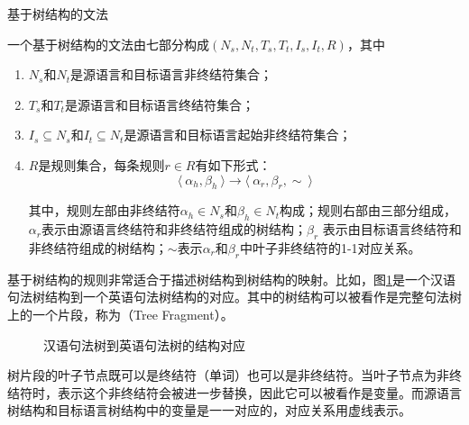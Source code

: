 \vspace{0.5em}
\begin{definition} 基于树结构的文法

{\small
一个基于树结构的文法由七部分构成$(N_s, N_t, T_s, T_t, I_s, I_t, R)$，其中
\begin{enumerate}
\item $N_s$和$N_t$是源语言和目标语言非终结符集合；
\item $T_s$和$T_t$是源语言和目标语言终结符集合；
\item $I_s \subseteq N_s$和$I_t \subseteq N_t$是源语言和目标语言起始非终结符集合；
\item $R$是规则集合，每条规则$r \in R$有如下形式：
\vspace{-1em}
\begin{displaymath}
\langle\  \alpha_h, \beta_h\ \rangle \to \langle\ \alpha_r, \beta_r, \sim\ \rangle
\end{displaymath}

其中，规则左部由非终结符$\alpha_h \in N_s$和$\beta_h \in N_t$构成；规则右部由三部分组成，$\alpha_r$表示由源语言终结符和非终结符组成的树结构；$\beta_r$ 表示由目标语言终结符和非终结符组成的树结构；$\sim$表示$\alpha_r$和$\beta_r$中叶子非终结符的1-1对应关系。
\end{enumerate}
}
\end{definition}

\parinterval 基于树结构的规则非常适合于描述树结构到树结构的映射。比如，图\ref{fig:8-19}是一个汉语句法树结构到一个英语句法树结构的对应。其中的树结构可以被看作是完整句法树上的一个片段，称为{\small{}}（Tree Fragment）。

\begin{figure}[htp]
\centering

\vspace{-2em}
\caption{汉语句法树到英语句法树的结构对应}
\label{fig:8-19}
\end{figure}

\parinterval 树片段的叶子节点既可以是终结符（单词）也可以是非终结符。当叶子节点为非终结符时，表示这个非终结符会被进一步替换，因此它可以被看作是变量。而源语言树结构和目标语言树结构中的变量是一一对应的，对应关系用虚线表示。

